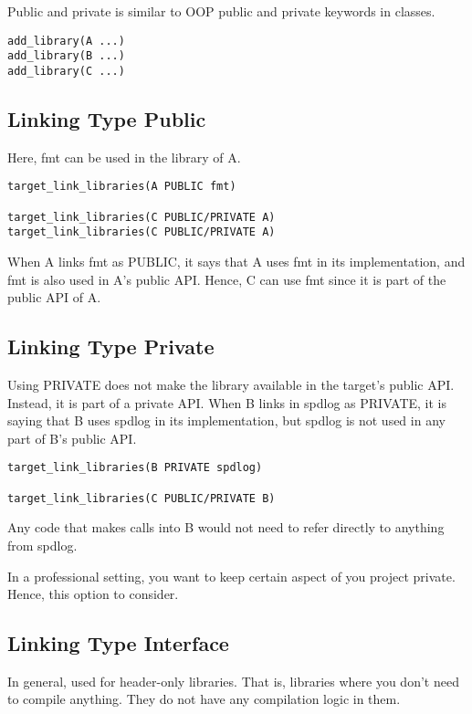 Public and private is similar to OOP public and private keywords in classes.

\begin{verbatim}
add_library(A ...)
add_library(B ...)
add_library(C ...)
\end{verbatim}

\subsection{Linking Type Public}

Here, fmt can be used in the library of A. 

\begin{verbatim}
target_link_libraries(A PUBLIC fmt)

target_link_libraries(C PUBLIC/PRIVATE A)
target_link_libraries(C PUBLIC/PRIVATE A)
\end{verbatim}

When A links fmt as PUBLIC, it says that A uses fmt in its implementation, and fmt is also used in A's public API.
Hence, C can use fmt since it is part of the public API of A.

\subsection{Linking Type Private}

Using PRIVATE does not make the library available in the target's public API. Instead, it is part of a private API.
When B links in spdlog as PRIVATE, it is saying that B uses spdlog in its implementation,
but spdlog is not used in any part of B's public API. 

\begin{verbatim}
target_link_libraries(B PRIVATE spdlog)

target_link_libraries(C PUBLIC/PRIVATE B)
\end{verbatim}

Any code that makes calls into B would not need to refer directly to anything from
spdlog.


In a professional setting, you want to keep certain aspect of you project private. Hence, this option to consider.

\subsection{Linking Type Interface}

In general, used for header-only libraries. That is, libraries where you don't need to compile anything. They do not have
any compilation logic in them.

